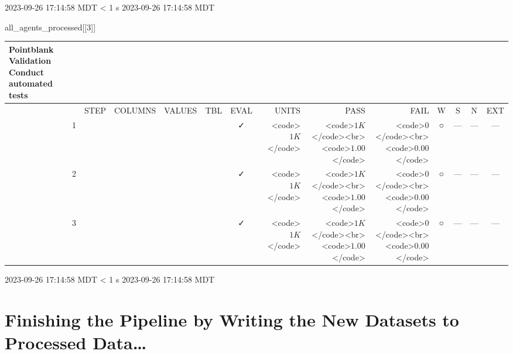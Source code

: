 \documentclass[
  letterpaper,
  DIV=11,
  numbers=noendperiod]{scrreprt}
\newenvironment{Shaded}{\begin{snugshade}}{\end{snugshade}}
\newcommand{\DecValTok}[1]{\textcolor[rgb]{0.68,0.00,0.00}{#1}}
\newcommand{\NormalTok}[1]{\textcolor[rgb]{0.00,0.23,0.31}{#1}}
\begin{document}
\begin{minipage}{\linewidth}
2023-09-26 17:14:58 MDT
\textless{} 1 s
2023-09-26 17:14:58 MDT\\
\end{minipage}

\begin{Shaded}
\begin{Highlighting}[]
\NormalTok{all\_agents\_processed[[}\DecValTok{3}\NormalTok{]]}
\end{Highlighting}
\end{Shaded}

\setlength{\LTpost}{0mm}
\begin{longtable}{lrlllccrrrcccc}
\caption*{
{\large Pointblank Validation} \\ 
{\small Conduct automated tests}
} \\ 
\toprule
 &  & STEP & COLUMNS & VALUES & TBL & EVAL & UNITS & PASS & FAIL & W & S & N & EXT \\ 
\midrule
 & 1 &  &  &  &                                                              & ✓ & <code>$1K$</code> & <code>$1K$</code><br><code>$1.00$</code> & <code>$0$</code><br><code>$0.00$</code> & ○ & --- & --- & --- \\ 
 & 2 &  &  &  &                                                              & ✓ & <code>$1K$</code> & <code>$1K$</code><br><code>$1.00$</code> & <code>$0$</code><br><code>$0.00$</code> & ○ & --- & --- & --- \\ 
 & 3 &  &  &  &                                                              & ✓ & <code>$1K$</code> & <code>$1K$</code><br><code>$1.00$</code> & <code>$0$</code><br><code>$0.00$</code> & ○ & --- & --- & --- \\ 
\bottomrule
\end{longtable}
\begin{minipage}{\linewidth}
2023-09-26 17:14:58 MDT
\textless{} 1 s
2023-09-26 17:14:58 MDT\\
\end{minipage}

\hypertarget{finishing-the-pipeline-by-writing-the-new-datasets-to-processed-data}{%
\section{Finishing the Pipeline by Writing the New Datasets to Processed
Data\ldots{}}\label{finishing-the-pipeline-by-writing-the-new-datasets-to-processed-data}}
\end{document}
